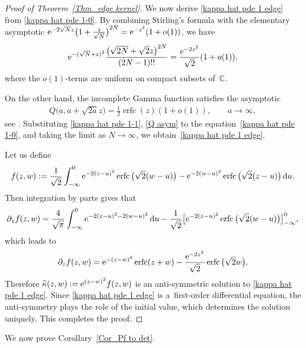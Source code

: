 \documentclass[pdftex]{sigma}
\numberwithin{equation}{section}
\newcommand{\erfc}{\operatorname{erfc}}
\newcommand{\C}{{\mathbb C}}
\newcommand{\1}{\chi}
\begin{document}
\begin{proof}[Proof of Theorem~\ref{Thm_edge kernel}]
We now derive \eqref{kappa hat pde 1 edge} from \eqref{kappa hat pde 1-0}. By combining Stirling's formula with the elementary asymptotic
	${\rm e}^{ -2\sqrt{N} z } \big( 1+\tfrac{z}{\sqrt{N}} \big)^{2N} = {\rm e}^{ -z^2 } (1+o(1))$,
	we have
	\begin{gather} \label{kappa hat pde 1-1}
		{\rm e}^{ -( \sqrt{N}+ z)^2 } \frac{\big( \sqrt{2N}+ \sqrt{2}z \big)^{2N}}{(2N-1)!!}
		= \frac{{\rm e}^{-2z^2}}{\sqrt{2}} (1+o(1)),
	\end{gather}
 where the $o(1)$-terms are uniform on compact subsets of~$\C$.

	On the other hand, the incomplete Gamma function satisfies the asymptotic
	\begin{gather}\label{Q asym}
		Q\big(a,a+\sqrt{2a}z\big) = \tfrac12 \erfc(z) (1+o(1)), \qquad a\to \infty,
	\end{gather}
	see \cite[equation~(8.11.10)]{olver2010nist}. Substituting \eqref{kappa hat pde 1-1}, \eqref{Q asym} to the equation~\eqref{kappa hat pde 1-0}, and taking the limit as $N \to \infty$, we obtain~\eqref{kappa hat pde 1 edge}.
	
	Let us define
	\begin{gather*}
	f(z,w):=\frac{ 1 }{\sqrt{2}} \int_{-\infty}^0 {\rm e}^{-2(z-u)^2 } \erfc\big( \sqrt{2}(w-u) \big)- {\rm e}^{-2(w-u)^2 } \erfc\big( \sqrt{2}(z-u) \big) \, {\rm d}u.
	\end{gather*}
	Then integration by parts gives that
	\begin{gather*}
		\partial_z f(z,w)=\frac{4}{\sqrt{\pi}}\int_{-\infty}^0 {\rm e}^{-2(z-u)^2-2(w-u)^2}\,{\rm d}u-\frac{1}{\sqrt{2}}\big[ {\rm e}^{-2(z-u)^2} \erfc\big(\sqrt{2}(w-u)\big)\big]_{-\infty}^0,
	\end{gather*}
	which leads to
	\begin{align*}
		\begin{split}
			\partial_z f(z,w)=
			{\rm e}^{-(z-w)^2} \erfc(z+w)-\frac{ {\rm e}^{-2z^2 } }{ \sqrt{2} }\erfc\big(\sqrt{2}w\big).
		\end{split}
	\end{align*}
	Therefore $\widehat{\kappa}(z,w):={\rm e}^{(z-w)^2}f(z,w)$ is an anti-symmetric solution to \eqref{kappa hat pde 1 edge}.
	Since \eqref{kappa hat pde 1 edge} is a~first-order differential equation, the anti-symmetry plays the role of the initial value, which determines the solution uniquely.
	This completes the proof.
\end{proof}

We now prove Corollary~\ref{Cor_Pf to det}.
\end{document}
